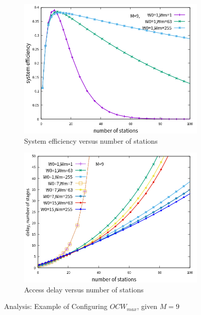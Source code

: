 \begin{figure}[!t]
\centering
\begin{subfigure}{\textwidth}  
  \centering  
  \includegraphics[scale=0.85]{./figure/chp4/M9/n_eff_perf_W01.png}  
    \caption{System efficiency versus number of stations}   
    \label{fig_n_eff_Wm}
\end{subfigure}   

\begin{subfigure}{\textwidth}
	\centering
\includegraphics[scale=.85]{./figure/chp4/M9/n_delay_perf.png}
\caption{Access delay versus number of stations}
\label{fig_n_delay_Wm}
\end{subfigure}
\caption{Analysis: Example of Configuring $OCW_{max}$, given $M=9$}
\end{figure}

